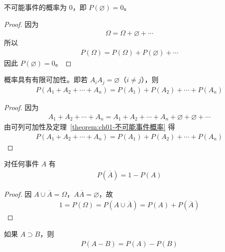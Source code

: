 \documentclass[../../main.tex]{subfiles}
\begin{document}
\begin{theorem}[不可能事件概率]\label{theorem:ch01-不可能事件概率}
不可能事件的概率为 $0$，即 $P(\varnothing)=0$。
\end{theorem}

\begin{proof}
因为
\begin{align*}
\Omega=\Omega+\varnothing+\cdots
\end{align*}
所以
\begin{align*}
P(\Omega)=P(\Omega)+P(\varnothing)+\cdots
\end{align*}
因此 $P(\varnothing)=0$。
\end{proof}

\begin{theorem}[有限可加性]\label{theorem:ch01-有限可加性}
概率具有有限可加性。即若 $A_iA_j=\varnothing$（$i\neq j$），则
\begin{align}
P(A_1+A_2+\cdots+A_n)=P(A_1)+P(A_2)+\cdots+P(A_n)\label{align:ch01-有限可加性}
\end{align}
\end{theorem}

\begin{proof}
因为
\begin{align*}
A_1+A_2+\cdots+A_n=A_1+A_2+\cdots+A_n+\varnothing+\varnothing+\cdots
\end{align*}
由可列可加性及定理~\ref{theorem:ch01-不可能事件概率} 得
\begin{align*}
P(A_1+A_2+\cdots+A_n)=P(A_1)+P(A_2)+\cdots+P(A_n)
\end{align*}
\end{proof}

\begin{theorem}[逆事件概率]\label{theorem:ch01-逆事件概率一般}
对任何事件 $A$ 有
\begin{align}
P(\overline{A})=1-P(A)\label{align:ch01-逆事件概率一般}
\end{align}
\end{theorem}

\begin{proof}
因 $A\cup\overline{A}=\Omega$，$A\overline{A}=\varnothing$，故
\begin{align*}
1=P(\Omega)=P(A\cup\overline{A})=P(A)+P(\overline{A})
\end{align*}
\end{proof}

\begin{theorem}[差事件概率]\label{theorem:ch01-差事件概率}
如果 $A\supset B$，则
\begin{align}
P(A-B)=P(A)-P(B)\label{align:ch01-差事件概率}
\end{align}
\end{theorem}
\end{document}

